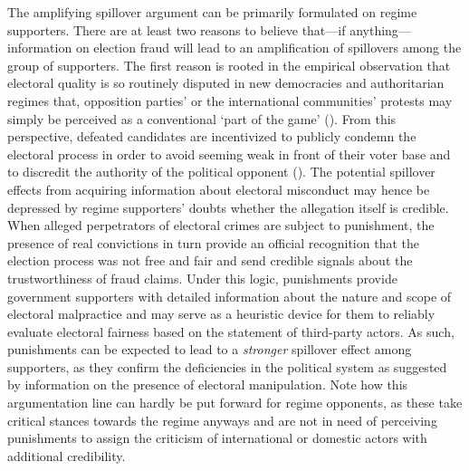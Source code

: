 \documentclass[11pt, ngerman,english,a4]{article}
\begin{document}
The amplifying spillover argument can be primarily formulated on regime supporters. There are at least two reasons to believe that---if anything---information on election fraud will lead to an amplification of spillovers among the group of supporters. The first reason is rooted in the empirical observation that electoral quality is so routinely disputed in new democracies and authoritarian regimes that, opposition parties' or the international communities' protests may simply be perceived as a conventional ‘part of the game' (\citealt{Kerr2020}). From this perspective, defeated candidates are incentivized to publicly condemn the electoral process in order to avoid seeming weak in front of their voter base and to discredit the authority of the political opponent (\citealt{Lindberg2006}). The potential spillover effects from acquiring information about electoral misconduct may hence be depressed by regime supporters' doubts whether the allegation itself is credible. When alleged perpetrators of electoral crimes are subject to punishment, the presence of real convictions in turn provide an official recognition that the election process was not free and fair and send credible signals about the trustworthiness of fraud claims. Under this logic, punishments provide government supporters with detailed information about the nature and scope of electoral malpractice and may serve as a heuristic device for them to reliably evaluate electoral fairness based on the statement of third-party actors. As such, punishments can be expected to lead to a \textit{stronger} spillover effect among supporters, as they confirm the deficiencies in the political system as suggested by information on the presence of electoral manipulation. Note how this argumentation line can hardly be put forward for regime opponents, as these take critical stances towards the regime anyways and are not in need of perceiving punishments to assign the criticism of international or domestic actors with additional credibility. 
\end{document}

